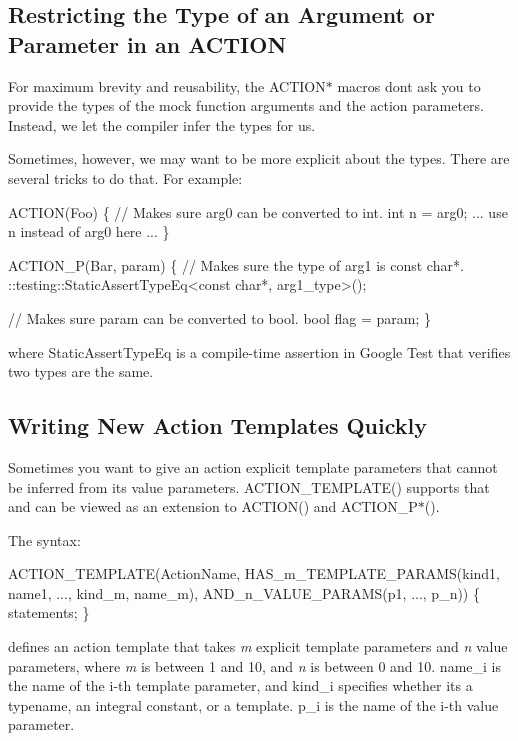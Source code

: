 \subsection*{Restricting the Type of an Argument or Parameter in an A\+C\+T\+I\+ON}

For maximum brevity and reusability, the {\ttfamily A\+C\+T\+I\+O\+N$\ast$} macros don\textquotesingle{}t ask you to provide the types of the mock function arguments and the action parameters. Instead, we let the compiler infer the types for us.

Sometimes, however, we may want to be more explicit about the types. There are several tricks to do that. For example\+: 
\begin{DoxyCode}
ACTION(Foo) \{
  // Makes sure arg0 can be converted to int.
  int n = arg0;
  ... use n instead of arg0 here ...
\}

ACTION\_P(Bar, param) \{
  // Makes sure the type of arg1 is const char*.
  ::testing::StaticAssertTypeEq<const char*, arg1\_type>();

  // Makes sure param can be converted to bool.
  bool flag = param;
\}
\end{DoxyCode}
 where {\ttfamily Static\+Assert\+Type\+Eq} is a compile-\/time assertion in Google Test that verifies two types are the same.

\subsection*{Writing New Action Templates Quickly}

Sometimes you want to give an action explicit template parameters that cannot be inferred from its value parameters. {\ttfamily A\+C\+T\+I\+O\+N\+\_\+\+T\+E\+M\+P\+L\+A\+T\+E()} supports that and can be viewed as an extension to {\ttfamily A\+C\+T\+I\+O\+N()} and {\ttfamily A\+C\+T\+I\+O\+N\+\_\+\+P$\ast$()}.

The syntax\+: 
\begin{DoxyCode}
ACTION\_TEMPLATE(ActionName,
                HAS\_m\_TEMPLATE\_PARAMS(kind1, name1, ..., kind\_m, name\_m),
                AND\_n\_VALUE\_PARAMS(p1, ..., p\_n)) \{ statements; \}
\end{DoxyCode}


defines an action template that takes {\itshape m} explicit template parameters and {\itshape n} value parameters, where {\itshape m} is between 1 and 10, and {\itshape n} is between 0 and 10. {\ttfamily name\+\_\+i} is the name of the i-\/th template parameter, and {\ttfamily kind\+\_\+i} specifies whether it\textquotesingle{}s a {\ttfamily typename}, an integral constant, or a template. {\ttfamily p\+\_\+i} is the name of the i-\/th value parameter.

